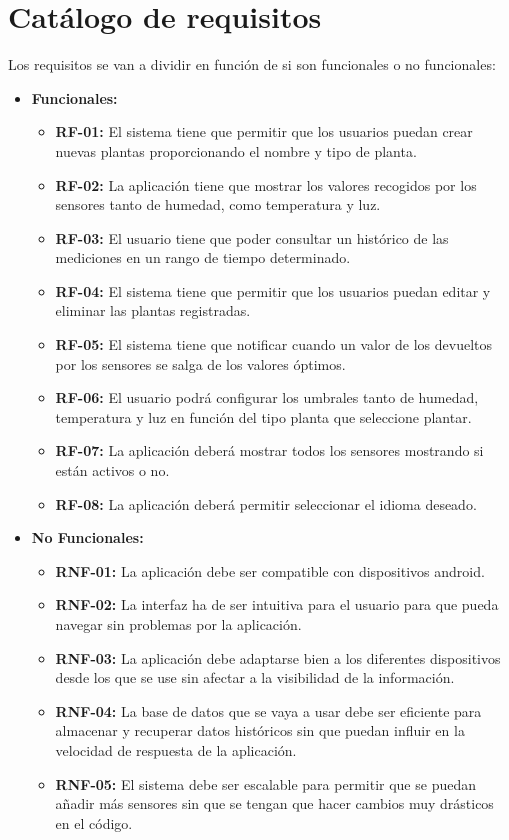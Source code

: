 \section{Catálogo de requisitos}
Los requisitos se van a dividir en función de si son funcionales o no funcionales:

\begin{itemize}
    \item \textbf{Funcionales:}
        \begin{itemize}
            \item \textbf{RF-01:} El sistema tiene que permitir que los usuarios puedan crear nuevas plantas proporcionando el nombre y tipo de planta.
            \item \textbf{RF-02:} La aplicación tiene que mostrar los valores recogidos por los sensores tanto de humedad, como temperatura y luz.
            \item \textbf{RF-03:} El usuario tiene que poder consultar un histórico de las mediciones en un rango de tiempo determinado.
            \item \textbf{RF-04:} El sistema tiene que permitir que los usuarios puedan editar y eliminar las plantas registradas.
            \item \textbf{RF-05:} El sistema tiene que notificar cuando un valor de los devueltos por los sensores se salga de los valores óptimos.
            \item \textbf{RF-06:} El usuario podrá configurar los umbrales tanto de humedad, temperatura y luz en función del tipo planta que seleccione plantar.
            \item \textbf{RF-07:} La aplicación deberá mostrar todos los sensores mostrando si están activos o no. 
            \item \textbf{RF-08:} La aplicación deberá permitir seleccionar el idioma deseado.
        \end{itemize}
    \item \textbf{No Funcionales:}
        \begin{itemize}
            \item \textbf{RNF-01:} La aplicación debe ser compatible con dispositivos android.
            \item \textbf{RNF-02:} La interfaz ha de ser intuitiva para el usuario para que pueda navegar sin problemas por la aplicación.
            \item \textbf{RNF-03:} La aplicación debe adaptarse bien a los diferentes dispositivos desde los que se use sin afectar a la visibilidad de la información.
            \item \textbf{RNF-04:} La base de datos que se vaya a usar debe ser eficiente para almacenar y recuperar datos históricos sin que puedan influir en la velocidad de respuesta de la aplicación.
            \item \textbf{RNF-05:} El sistema debe ser escalable para permitir que se puedan añadir más sensores sin que se tengan que hacer cambios muy drásticos en el código.
        \end{itemize}
\end{itemize}


